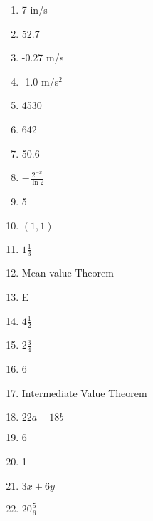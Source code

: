 \documentclass[../uilmath.tex]{subfiles}
\begin{document}
\begin{enumerate}[label=\bfseries\arabic*.]
    \item %
    7 in/s 

    \item %
    52.7

    \item %
    -0.27 m/s 

    \item %
    -1.0 m/s$^2$

    \item %
    4530

    \item %
    642

    \item %
    50.6

    \item %
    $-\frac{2^{-x}}{\ln 2}$

    \item %
    5

    \item %
    $(1,1)$

    \item %
    $1\frac{1}{3}$

    \item %
    Mean-value Theorem 

    \item %
    E 

    \item %
    $4\frac{1}{2}$

    \item %
    $2\frac{3}{4}$

    \item %
    6

    \item %
    Intermediate Value Theorem 

    \item %
    $22a-18b$

    \item %
    6

    \item %
    1

    \item %
    $3x+6y$

    \item %
    $20\frac{5}{6}$


\end{enumerate}
\end{document}
